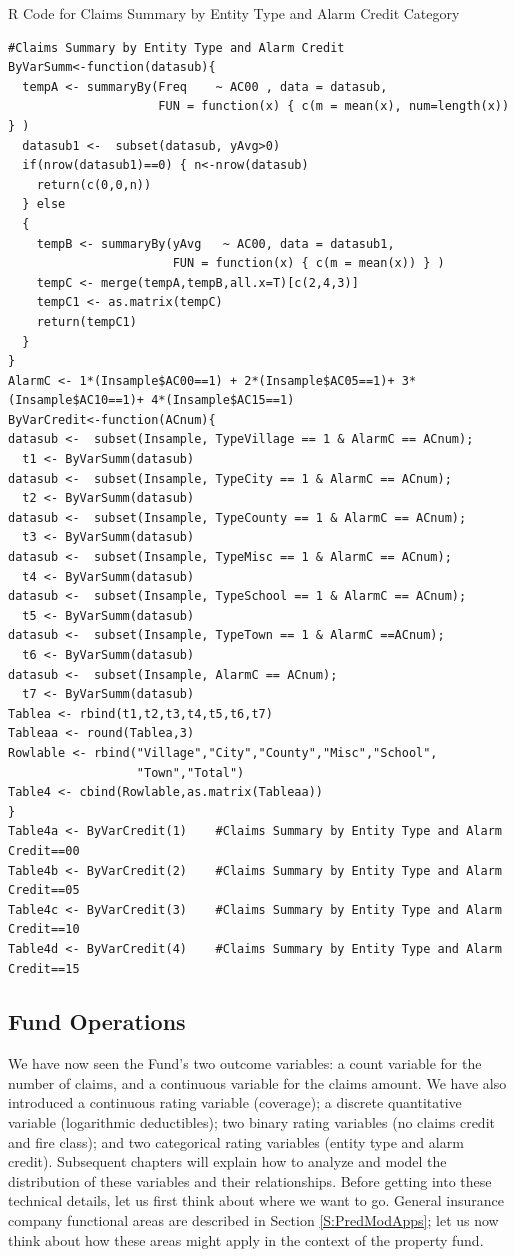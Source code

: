 \documentclass[]{book}
\theoremstyle{definition}
\theoremstyle{definition}
\theoremstyle{definition}
\theoremstyle{remark}
\begin{document}
R Code for Claims Summary by Entity Type and Alarm Credit Category

\hypertarget{display.RateAlarmCredit.2}{}
\begin{verbatim}
#Claims Summary by Entity Type and Alarm Credit
ByVarSumm<-function(datasub){
  tempA <- summaryBy(Freq    ~ AC00 , data = datasub,   
                     FUN = function(x) { c(m = mean(x), num=length(x)) } )
  datasub1 <-  subset(datasub, yAvg>0)
  if(nrow(datasub1)==0) { n<-nrow(datasub)
    return(c(0,0,n))
  } else 
  {
    tempB <- summaryBy(yAvg   ~ AC00, data = datasub1,
                       FUN = function(x) { c(m = mean(x)) } )
    tempC <- merge(tempA,tempB,all.x=T)[c(2,4,3)]
    tempC1 <- as.matrix(tempC)
    return(tempC1)
  }
}
AlarmC <- 1*(Insample$AC00==1) + 2*(Insample$AC05==1)+ 3*(Insample$AC10==1)+ 4*(Insample$AC15==1)
ByVarCredit<-function(ACnum){
datasub <-  subset(Insample, TypeVillage == 1 & AlarmC == ACnum); 
  t1 <- ByVarSumm(datasub)
datasub <-  subset(Insample, TypeCity == 1 & AlarmC == ACnum);      
  t2 <- ByVarSumm(datasub)
datasub <-  subset(Insample, TypeCounty == 1 & AlarmC == ACnum);   
  t3 <- ByVarSumm(datasub)
datasub <-  subset(Insample, TypeMisc == 1 & AlarmC == ACnum);
  t4 <- ByVarSumm(datasub)
datasub <-  subset(Insample, TypeSchool == 1 & AlarmC == ACnum);    
  t5 <- ByVarSumm(datasub)
datasub <-  subset(Insample, TypeTown == 1 & AlarmC ==ACnum);      
  t6 <- ByVarSumm(datasub)
datasub <-  subset(Insample, AlarmC == ACnum);  
  t7 <- ByVarSumm(datasub)
Tablea <- rbind(t1,t2,t3,t4,t5,t6,t7)
Tableaa <- round(Tablea,3)
Rowlable <- rbind("Village","City","County","Misc","School",
                  "Town","Total")
Table4 <- cbind(Rowlable,as.matrix(Tableaa))
}
Table4a <- ByVarCredit(1)    #Claims Summary by Entity Type and Alarm Credit==00
Table4b <- ByVarCredit(2)    #Claims Summary by Entity Type and Alarm Credit==05 
Table4c <- ByVarCredit(3)    #Claims Summary by Entity Type and Alarm Credit==10
Table4d <- ByVarCredit(4)    #Claims Summary by Entity Type and Alarm Credit==15
\end{verbatim}

\subsection{Fund Operations}\label{fund-operations}

We have now seen the Fund's two outcome variables: a count variable for
the number of claims, and a continuous variable for the claims amount.
We have also introduced a continuous rating variable (coverage); a
discrete quantitative variable (logarithmic deductibles); two binary
rating variables (no claims credit and fire class); and two categorical
rating variables (entity type and alarm credit). Subsequent chapters
will explain how to analyze and model the distribution of these
variables and their relationships. Before getting into these technical
details, let us first think about where we want to go. General insurance
company functional areas are described in Section \ref{S:PredModApps};
let us now think about how these areas might apply in the context of the
property fund.
\end{document}
